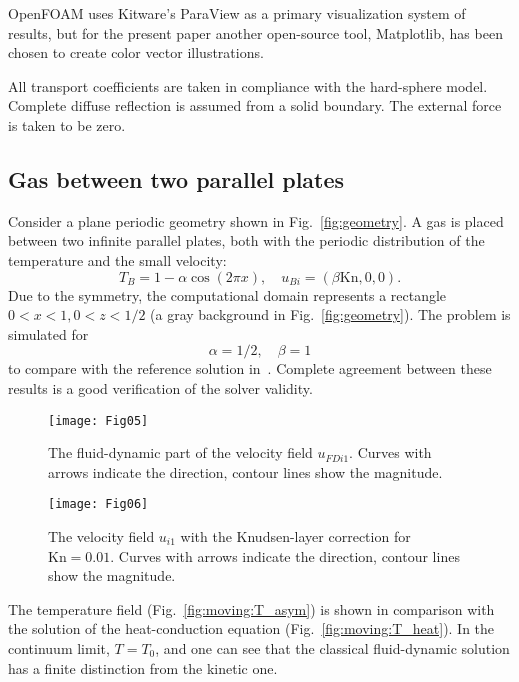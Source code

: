 \documentclass[smallextended, final]{svjour3} %
\newcommand{\Kn}{\mathrm{Kn}}
\begin{document}
OpenFOAM\textregistered{} uses Kitware's ParaView\textregistered{} as a primary visualization system of results,
but for the present paper another open-source tool, Matplotlib, has been chosen to create color vector illustrations.

All transport coefficients are taken in compliance with the hard-sphere model.
Complete diffuse reflection is assumed from a solid boundary.
The external force is taken to be zero.

\subsection{Gas between two parallel plates}

Consider a plane periodic geometry shown in Fig.~\ref{fig:geometry}.
A gas is placed between two infinite parallel plates,
both with the periodic distribution of the temperature and the small velocity:
\begin{equation}
    T_B = 1-\alpha\cos(2\pi x), \quad u_{Bi} = (\beta\Kn,0,0).
\end{equation}
Due to the symmetry, the computational domain represents a rectangle \(0<x<1, 0<z<1/2\)
(a gray background in Fig.~\ref{fig:geometry}).
The problem is simulated for
\[ \alpha=1/2, \quad \beta = 1 \]
to compare with the reference solution in~\cite{SoneBobylev96}.
Complete agreement between these results is a good verification of the solver validity.

\begin{figure}
    \centering
    \texttt{[image: Fig05]}
    \caption{The fluid-dynamic part of the velocity field \(u_{FDi1}\).
        Curves with arrows indicate the direction, contour lines show the magnitude.}
    \label{fig:moving:fluid}
\end{figure}

\begin{figure}
    \centering
    \texttt{[image: Fig06]}
    \caption{The velocity field \(u_{i1}\) with the Knudsen-layer correction for \(\Kn=0.01\).
        Curves with arrows indicate the direction, contour lines show the magnitude.}
    \label{fig:moving:kn001}
\end{figure}

The temperature field (Fig.~\ref{fig:moving:T_asym}) is shown
in comparison with the solution of the heat-conduction equation (Fig.~\ref{fig:moving:T_heat}).
In the continuum limit, \(T=T_0\), and one can see that the classical fluid-dynamic solution
has a finite distinction from the kinetic one.
\end{document}
